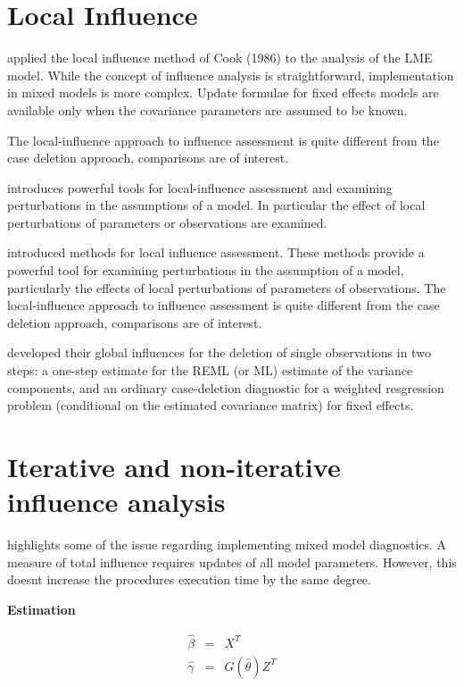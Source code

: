 \documentclass[12pt, a4paper]{report}
\theoremstyle{plain}
\theoremstyle{definition}
\theoremstyle{remark}
\begin{document}
\section{Local Influence}
\citet{Beckman} applied the local influence method of Cook (1986) to the analysis of the LME model.
While the concept of influence analysis is straightforward, implementation in mixed models is more complex. Update formulae for fixed effects models are available only when the covariance parameters are assumed to be known.


The local-influence approach to influence assessment is quite different from the case deletion approach, comparisons are of
interest. 

\citet{cook86} introduces powerful tools for local-influence assessment and examining perturbations in the assumptions of a model. In particular the effect of local perturbations of parameters or observations are examined.

\citet{cook86} introduced methods for local influence assessment. These methods provide a powerful tool for examining perturbations in the assumption of a model, particularly the effects of local perturbations of parameters of observations. The local-influence approach to influence assessment is quite different from the case deletion approach, comparisons are of interest.

\citet{Christensen} developed their global influences for the deletion of single observations in two steps: a one-step estimate for the REML (or ML) estimate of the variance components, and an ordinary case-deletion diagnostic for a weighted resgression problem (conditional on the estimated covariance matrix) for fixed effects.


\section{Iterative and non-iterative influence analysis}
\citet{schabenberger} highlights some of the issue regarding implementing mixed model diagnostics.
A measure of total influence requires updates of all model parameters.
However, this doesnt increase the procedures execution time by the same degree.

\noindent \textbf{Estimation}

\begin{eqnarray}
\hat{\beta} &=& X^{T} \\
\hat{\gamma} &=& G(\hat{\theta})Z^{T}
\end{eqnarray}
\end{document}

